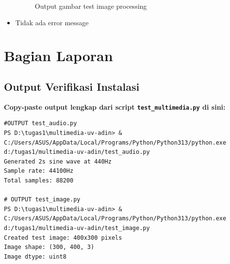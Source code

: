 \documentclass[11pt,a4paper]{article}
\begin{document}
\begin{itemize}
\begin{figure}[H]
            \caption{Output gambar test image processing}
        \end{figure}
    \item Tidak ada error message 
\end{itemize}

\section{Bagian Laporan}

\subsection{Output Verifikasi Instalasi}
\textbf{Copy-paste output lengkap dari script \texttt{test\_multimedia.py} di sini:}

\begin{lstlisting}[caption=Output verifikasi instalasi]
#OUTPUT test_audio.py
PS D:\tugas1\multimedia-uv-adin> & C:/Users/ASUS/AppData/Local/Programs/Python/Python313/python.exe d:/tugas1/multimedia-uv-adin/test_audio.py
Generated 2s sine wave at 440Hz
Sample rate: 44100Hz
Total samples: 88200

# OUTPUT test_image.py
PS D:\tugas1\multimedia-uv-adin> & C:/Users/ASUS/AppData/Local/Programs/Python/Python313/python.exe d:/tugas1/multimedia-uv-adin/test_image.py
Created test image: 400x300 pixels
Image shape: (300, 400, 3)
Image dtype: uint8
\end{lstlisting}
\end{document}
